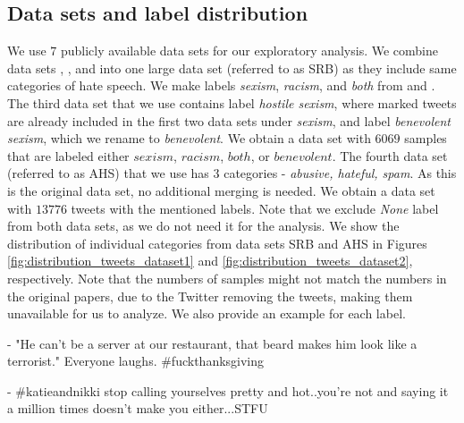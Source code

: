 \documentclass[fleqn,moreauthors,10pt]{ds_report}
\newcommand\bm{0.2pt}
\begin{document}
\subsection{Data sets and label distribution}
We use $7$ publicly available data sets for our exploratory analysis. We combine data sets \cite{waseem2016you}, \cite{waseem2016hateful}, and \cite{jha2017does} into one large data set (referred to as SRB) as they include same categories of hate speech. We make labels \textit{sexism}, \textit{racism}, and \textit{both} from \cite{waseem2016you} and \cite{waseem2016hateful}. The third data set \cite{jha2017does} that we use contains label \textit{hostile sexism}, where marked tweets are already included in the first two data sets under \textit{sexism}, and label \textit{benevolent sexism}, which we rename to \textit{benevolent}. We obtain a data set with $6069$ samples that are labeled either $sexism$, $racism$, $both$, or $benevolent$.
The fourth data set (referred to as AHS)\cite{founta2018large} that we use has $3$ categories - \textit{abusive,
hateful, spam}. As this is the original data set, no additional merging is needed. We obtain a data set with $13776$ tweets with the mentioned labels. Note that we exclude \textit{None} label from both data sets, as we do not need it for the analysis.
We show the distribution of individual categories from data sets SRB and AHS in Figures \ref{fig:distribution_tweets_dataset1} and \ref{fig:distribution_tweets_dataset2}, respectively. Note that the numbers of samples might not match the numbers in the original papers, due to the Twitter removing the tweets, making them unavailable for us to analyze. We also provide an example for each label.

\begin{tcolorbox}[colback=black!8,width=0.9\linewidth, center,arc=8pt,sharp corners=downhill, boxrule=0.3pt, left=\bm, top=\bm, right=\bm, bottom=\bm, fontupper=\small]
 - "He can't be a server at our restaurant, that beard makes him look like a terrorist." Everyone laughs. \#fuckthanksgiving
\end{tcolorbox}

\begin{tcolorbox}[colback=black!8, width=0.9\linewidth, center,arc=8pt,sharp corners=downhill, boxrule=0.3pt, left=\bm, top=\bm, right=\bm, bottom=\bm, fontupper=\small]
 - \#katieandnikki stop calling yourselves pretty and hot..you're not and saying it a million times doesn't make you either...STFU
\end{tcolorbox}
\end{document}
